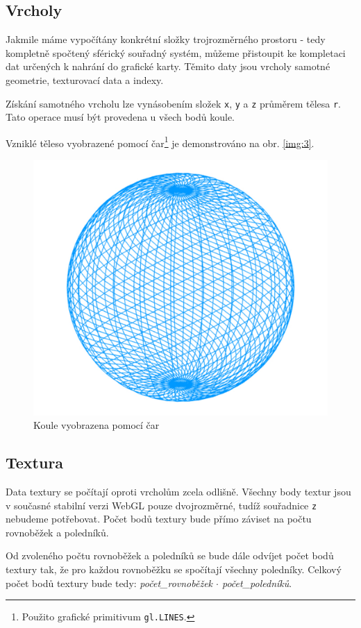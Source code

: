 \newpage


\subsection{Vrcholy}
Jakmile máme vypočítány konkrétní složky trojrozměrného prostoru - tedy kompletně spočtený sférický souřadný systém, můžeme přistoupit ke kompletaci dat určených k nahrání do grafické karty. Těmito daty jsou vrcholy samotné geometrie, texturovací data a indexy. 

Získání samotného vrcholu lze vynásobením složek \texttt{x}, \texttt{y} a \texttt{z} průměrem tělesa \texttt{r}. Tato operace musí být provedena u všech bodů koule.

Vzniklé těleso vyobrazené pomocí čar\footnote{Použito grafické primitivum \texttt{gl.LINES}.} je demonstrováno na obr. \ref{img:3}.


\begin{figure}[h]
	\label{img:3}
	\centering
	\includegraphics[scale=1.0,angle=0,width=0.55\linewidth]{obrazky-figures/vertex}
	\caption{Koule vyobrazena pomocí čar}
	\label{fig:geom2}
\end{figure}


\subsection{Textura}
Data textury se počítají oproti vrcholům zcela odlišně. Všechny body textur jsou v současné stabilní verzi WebGL pouze dvojrozměrné, tudíž souřadnice \texttt{z} nebudeme potřebovat.
Počet bodů textury bude přímo záviset na počtu rovnoběžek a poledníků.

Od zvoleného počtu rovnoběžek a poledníků se bude dále odvíjet počet bodů textury tak, že pro každou rovnoběžku se spočítají všechny poledníky. Celkový počet bodů textury bude tedy: \textit{počet\_rovnoběžek $\cdot$ počet\_poledníků}.


